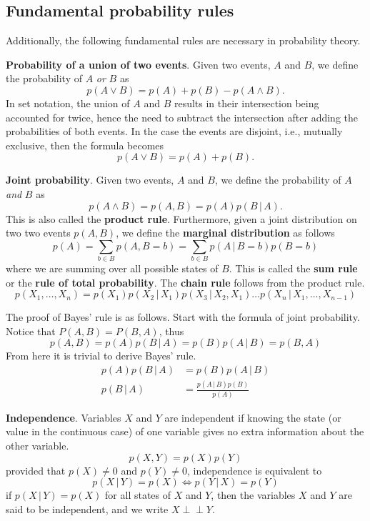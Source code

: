 \documentclass{article}
\newcommand{\indep}{\perp \!\!\! \perp}
\begin{document}
\subsection{Fundamental probability rules}
Additionally, the following fundamental rules are necessary in probability theory. 
\\
\begin{theorem}
    \textbf{Probability of a union of two events}. Given two events, $A$ and $B$, we define the probability of $A$ \textit{or} $B$ as 
    $$
        p(A \lor B) = p(A) + p(B) - p(A \land B) .
    $$
    In set notation, the union of $A$ and $B$ results in their intersection being accounted for twice, hence the need to subtract the intersection after adding the probabilities of both events. In the case the events are disjoint, i.e., mutually exclusive, then the formula becomes
    $$
        p(A \lor B) = p(A) + p(B) .
    $$
\end{theorem}

\begin{theorem}
    \textbf{Joint probability}. Given two events, $A$ and $B$, we define the probability of $A$ \textit{and} $B$ as 
    $$
        p(A \land B) = p(A, B) = p(A) p(B \,|\, A) .
    $$
    This is also called the \textbf{product rule}. Furthermore, given a joint distribution on two two events $p(A, B)$, we define the \textbf{marginal distribution} as follows
    $$
        p(A) = \sum_{b \in B} p(A, B=b) = \sum_{b \in B} p(A \,|\, B=b)p(B=b)
    $$
    where we are summing over all possible states of $B$. This is called the \textbf{sum rule} or the \textbf{rule of total probability}. The \textbf{chain rule} follows from the product rule.
    $$
        p(X_1, \dots, X_n) = p(X_1)p(X_2\,|\,X_1)p(X_3\,|\,X_2, X_1)\dots p(X_n\,|\,X_1,\dots,X_{n-1})
    $$
\end{theorem}

\noindent The proof of Bayes' rule is as follows. Start with the formula of joint probability. Notice that $P(A, B) = P(B, A)$, thus
$$
    p(A, B) = p(A) p(B \,|\, A) = p(B) p(A \,|\, B) = p(B, A)
$$
From here it is trivial to derive Bayes' rule.
\begin{align*}
    p(A) p(B \,|\, A) &= p(B) p(A \,|\, B)\\
    p(B \,|\, A) &= \frac{p(A \,|\, B)p(B)}{p(A)}
\end{align*}

\begin{theorem}
    \textbf{Independence}. Variables $X$ and $Y$ are independent if knowing the state (or value in the continuous case) of one variable gives no extra information about the other variable. 
    $$
        p(X, Y) = p(X)p(Y)
    $$
    provided that $p(X) \neq 0$ and $p(Y) \neq 0$, independence is equivalent to 
    $$
        p(X\,|\,Y) = p(X) \iff p(Y\,|\,X) = p(Y)
    $$
    if $p(X\,|\,Y) = p(X)$ for all states of $X$ and $Y$, then the variables $X$ and $Y$ are said to be independent, and we write $X \indep Y$.  
\end{theorem}
\end{document}
